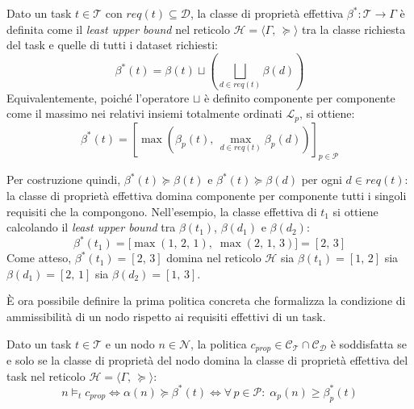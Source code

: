 \begin{definition}
    \label{def:classe_effettiva}
    Dato un task $t \in \mathcal{T}$ con $req(t) \subseteq \mathcal{D}$, la classe di proprietà effettiva $\beta^* : \mathcal{T} \rightarrow \Gamma$ è definita come il \emph{least upper bound} nel reticolo $\mathcal{H} = \langle \Gamma,\, \succeq \rangle$ tra la classe richiesta del task e quelle di tutti i dataset richiesti:
    \begin{equation}
        \beta^*(t) = \beta(t) \sqcup \left( \bigsqcup_{d \in req(t)} \beta(d) \right)
    \end{equation}
    Equivalentemente, poiché l'operatore $\sqcup$ è definito componente per componente come il massimo nei relativi insiemi totalmente ordinati $\mathcal{L}_p$, si ottiene:
    \begin{equation}
        \beta^*(t) = \left[ \max 
            \left( \beta_p(t),\, \max_{d \in req(t)} \beta_p(d) \right) 
        \right]_{p \in \mathcal{P}}
    \end{equation}
\end{definition}

Per costruzione quindi, $\beta^*(t) \succeq \beta(t)$ e $\beta^*(t) \succeq \beta(d)$ per ogni $d \in req(t)$: la classe di proprietà effettiva domina componente per componente tutti i singoli requisiti che la compongono. Nell'esempio, la classe effettiva di $t_1$ si ottiene calcolando il \emph{least upper bound} tra $\beta(t_1)$, $\beta(d_1)$ e $\beta(d_2)$:
\begin{equation}
    \beta^*(t_1)
    = \bigl[ \max(1,\,2,\,1),\;\max(2,\,1,\,3) \bigr]
    = [2,\,3]
\end{equation}
Come atteso, $\beta^*(t_1) = [2,\, 3]$ domina nel reticolo $\mathcal{H}$ sia $\beta(t_1) = [1,\, 2]$ sia $\beta(d_1) = [2,\, 1]$ sia $\beta(d_2) = [1,\, 3]$.

È ora possibile definire la prima politica concreta che formalizza la condizione di ammissibilità di un nodo rispetto ai requisiti effettivi di un task.

\begin{policy}
    \label{pol:cprop}
    Dato un task $t \in \mathcal{T}$ e un nodo $n \in \mathcal{N}$, la politica $c_{prop} \in \mathcal{C_T} \cap \mathcal{C_D}$ è soddisfatta se e solo se la classe di proprietà del nodo domina la classe di proprietà effettiva del task nel reticolo $\mathcal{H} = \langle \Gamma,\, \succeq \rangle$:
    \begin{equation}
        n \models_t c_{prop}
        \iff
        \alpha(n) \succeq \beta^*(t)
        \iff
        \forall\, p \in \mathcal{P}:\; \alpha_p(n) \geq \beta^*_p(t)
    \end{equation}
\end{policy}

